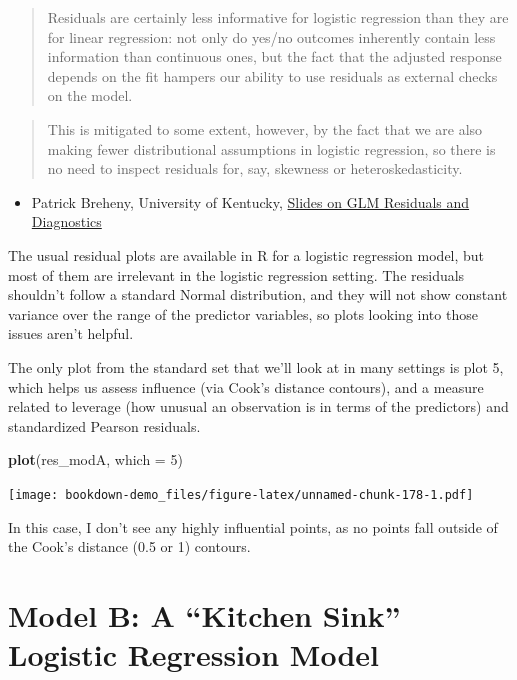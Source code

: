 \documentclass[]{book}
\newenvironment{Shaded}{\begin{snugshade}}{\end{snugshade}}
\newcommand{\KeywordTok}[1]{\textcolor[rgb]{0.13,0.29,0.53}{\textbf{#1}}}
\newcommand{\DataTypeTok}[1]{\textcolor[rgb]{0.13,0.29,0.53}{#1}}
\newcommand{\DecValTok}[1]{\textcolor[rgb]{0.00,0.00,0.81}{#1}}
\newcommand{\NormalTok}[1]{#1}
\providecommand{\tightlist}{%
  \setlength{\itemsep}{0pt}\setlength{\parskip}{0pt}}
\theoremstyle{definition}
\theoremstyle{definition}
\theoremstyle{definition}
\theoremstyle{remark}
\begin{document}
\begin{quote}
Residuals are certainly less informative for logistic regression than
they are for linear regression: not only do yes/no outcomes inherently
contain less information than continuous ones, but the fact that the
adjusted response depends on the fit hampers our ability to use
residuals as external checks on the model.
\end{quote}

\begin{quote}
This is mitigated to some extent, however, by the fact that we are also
making fewer distributional assumptions in logistic regression, so there
is no need to inspect residuals for, say, skewness or
heteroskedasticity.
\end{quote}

\begin{itemize}
\tightlist
\item
  Patrick Breheny, University of Kentucky,
  \href{https://web.as.uky.edu/statistics/users/pbreheny/760/S13/notes/3-26.pdf}{Slides
  on GLM Residuals and Diagnostics}
\end{itemize}

The usual residual plots are available in R for a logistic regression
model, but most of them are irrelevant in the logistic regression
setting. The residuals shouldn't follow a standard Normal distribution,
and they will not show constant variance over the range of the predictor
variables, so plots looking into those issues aren't helpful.

The only plot from the standard set that we'll look at in many settings
is plot 5, which helps us assess influence (via Cook's distance
contours), and a measure related to leverage (how unusual an observation
is in terms of the predictors) and standardized Pearson residuals.

\begin{Shaded}
\begin{Highlighting}[]
\KeywordTok{plot}\NormalTok{(res_modA, }\DataTypeTok{which =} \DecValTok{5}\NormalTok{)}
\end{Highlighting}
\end{Shaded}

\texttt{[image: bookdown-demo\_files/figure-latex/unnamed-chunk-178-1.pdf]}

In this case, I don't see any highly influential points, as no points
fall outside of the Cook's distance (0.5 or 1) contours.

\section{\texorpdfstring{Model B: A ``Kitchen Sink'' Logistic Regression
Model}{Model B: A Kitchen Sink Logistic Regression Model}}\label{model-b-a-kitchen-sink-logistic-regression-model}
\end{document}
